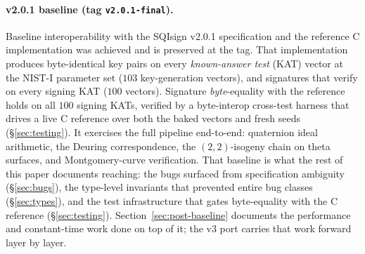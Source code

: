 \paragraph{v2.0.1 baseline (tag \texttt{v2.0.1-final}).}
Baseline interoperability with the SQIsign v2.0.1 specification and
the reference C implementation was achieved and is preserved at the
tag.  That implementation produces byte-identical key pairs on every
\emph{known-answer test} (KAT) vector at the NIST-I parameter set
($103$ key-generation vectors), and signatures that verify on every
signing KAT ($100$ vectors).  Signature \emph{byte}-equality with the
reference holds on all $100$ signing KATs, verified by a byte-interop
cross-test harness that drives a live C reference over both the baked
vectors and fresh seeds (\S\ref{sec:testing}).  It exercises the full
pipeline end-to-end: quaternion ideal arithmetic, the Deuring
correspondence, the $(2,2)$-isogeny chain on theta surfaces, and
Montgomery-curve verification.  That baseline is what the rest of this
paper documents reaching: the bugs surfaced from specification
ambiguity (\S\ref{sec:bugs}), the type-level invariants that prevented
entire bug classes (\S\ref{sec:types}), and the test infrastructure
that gates byte-equality with the C reference (\S\ref{sec:testing}).
Section~\ref{sec:post-baseline} documents the performance and
constant-time work done on top of it; the v3 port carries that work
forward layer by layer.
